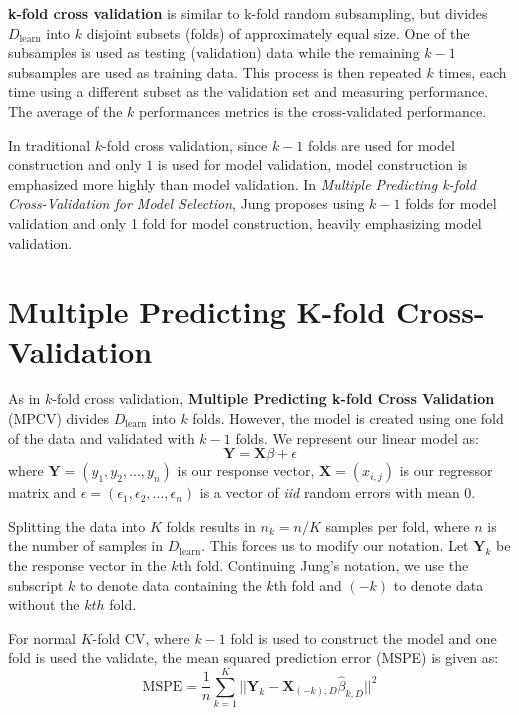 \documentclass[letter]{article}
\begin{document}
\textbf{k-fold cross validation} is similar to k-fold random subsampling, but divides \(D_{\textrm{learn}}\) into \(k\) disjoint subsets (folds) of approximately equal size.  One of the subsamples is used as testing (validation) data while the remaining \(k-1\) subsamples are used as training data.  This process is then repeated \(k\) times, each time using a different subset as the validation set and measuring performance. The average of the \(k\) performances metrics is the cross-validated performance.  \citep{Berrar_CrossValid}

In traditional \(k\)-fold cross validation, since \(k-1\) folds are used for model construction and only \(1\) is used for model validation, model construction is emphasized more highly than model validation.  In \textit{Multiple Predicting k-fold Cross-Validation for Model Selection}, Jung proposes using \(k-1\) folds for model validation and only 1 fold for model construction, heavily emphasizing model validation.  
\section{Multiple Predicting K-fold Cross-Validation}
As in \(k\)-fold cross validation, \textbf{Multiple Predicting k-fold Cross Validation} (MPCV) divides \(D_{\textrm{learn}}\) into \(k\) folds.  However, the model is created using one fold of the data and validated with \(k-1\) folds.  We represent our linear model as:
\begin{equation}
	\textbf{Y}=\textbf{X}\beta + \epsilon
\end{equation}
where \(\textbf{Y} = (y_1, y_2, ..., y_n) \) is our response vector, \(\textbf{X}=(x_{i,j})\) is our regressor matrix and \(\epsilon = (\epsilon_1, \epsilon_2, ..., \epsilon_n)\) is a vector of \textit{iid} random errors with mean 0.

Splitting the data into \(K\) folds results in \(n_k = n/K\) samples per fold, where \(n\) is the number of samples in \(D_{\textrm{learn}}\).  This forces us to modify our notation.  Let \(\textbf{Y}_k\) be the response vector in the \(k\)th fold.  Continuing Jung's notation, we use the subscript \(k\) to denote data containing the \(k\)th fold and \((-k)\) to denote data without the \(kth\) fold.

For normal \(K\)-fold CV, where \(k-1\) fold is used to construct the model and one fold is used the validate, the mean squared prediction error (MSPE) is given as:
\begin{equation}\label{eq:PE_CV}
	\textrm{MSPE} = \frac{1}{n}\sum_{k=1}^K \big|\big| \textbf{Y}_k-\textbf{X}_{(-k),D}\hat \beta_{k, D}\big|\big|^2
\end{equation}
\end{document}
